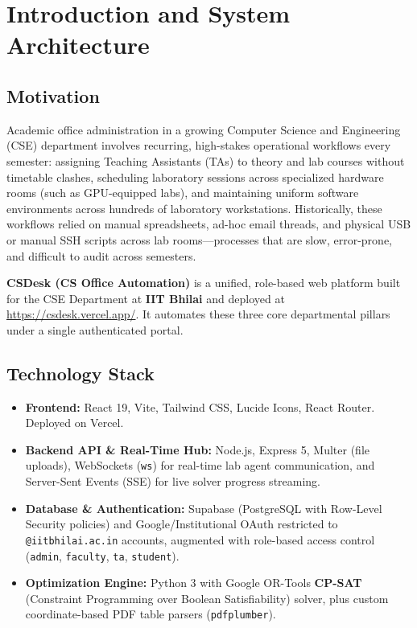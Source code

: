 \documentclass[12pt,a4paper]{article}
\begin{document}
\tableofcontents
\newpage
{}

\section{Introduction and System Architecture}

\subsection{Motivation}
Academic office administration in a growing Computer Science and Engineering (CSE) department involves recurring, high-stakes operational workflows every semester: assigning Teaching Assistants (TAs) to theory and lab courses without timetable clashes, scheduling laboratory sessions across specialized hardware rooms (such as GPU-equipped labs), and maintaining uniform software environments across hundreds of laboratory workstations. Historically, these workflows relied on manual spreadsheets, ad-hoc email threads, and physical USB or manual SSH scripts across lab rooms—processes that are slow, error-prone, and difficult to audit across semesters.

\textbf{CSDesk (CS Office Automation)} is a unified, role-based web platform built for the CSE Department at \textbf{IIT Bhilai} and deployed at \url{https://csdesk.vercel.app/}. It automates these three core departmental pillars under a single authenticated portal.

\subsection{Technology Stack}
\begin{itemize}[leftmargin=*]
    \item \textbf{Frontend:} React 19, Vite, Tailwind CSS, Lucide Icons, React Router. Deployed on Vercel.
    \item \textbf{Backend API \& Real-Time Hub:} Node.js, Express 5, Multer (file uploads), WebSockets (\texttt{ws}) for real-time lab agent communication, and Server-Sent Events (SSE) for live solver progress streaming.
    \item \textbf{Database \& Authentication:} Supabase (PostgreSQL with Row-Level Security policies) and Google/Institutional OAuth restricted to \texttt{@iitbhilai.ac.in} accounts, augmented with role-based access control (\texttt{admin}, \texttt{faculty}, \texttt{ta}, \texttt{student}).
    \item \textbf{Optimization Engine:} Python 3 with Google OR-Tools \textbf{CP-SAT} (Constraint Programming over Boolean Satisfiability) solver, plus custom coordinate-based PDF table parsers (\texttt{pdfplumber}).
\end{itemize}
\end{document}
